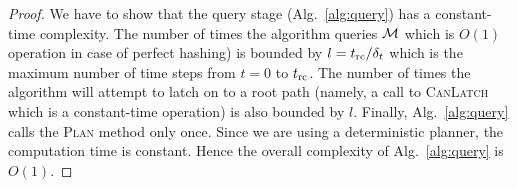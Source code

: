 \documentclass[conference]{IEEEtran}
\begin{document}
\begin{proof}
    We have to show that the query stage (Alg.~\ref{alg:query}) has a constant-time complexity. 
    The number of times the algorithm queries $\mathcal{M}$ which is $O(1)$ operation in case of perfect hashing) is bounded by $l = t_{\textrm{rc}}/\delta_t$ which is the maximum number of time steps from $t = 0$ to $t_{\textrm{rc}}$. 
    The number of times the algorithm will attempt to latch on to a root path (namely, a call to \textsc{CanLatch}  which is a constant-time operation) is also bounded by $l$. Finally, Alg.~\ref{alg:query} calls the \textsc{Plan} method only once.
    Since we are using a deterministic planner, the computation time is constant. 
    Hence the overall complexity of Alg.~\ref{alg:query} is $O(1)$.
\end{proof}

%
\end{document}
